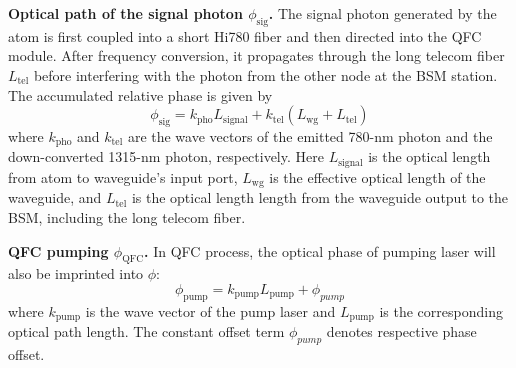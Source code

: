 \documentclass[aps,reprint,showpacs,superscriptaddress]{revtex4-2}
\begin{document}
\textbf{Optical path of the signal photon $\phi_{\text{sig}}$.}
The signal photon generated by the atom is first coupled into a short Hi780 fiber and then directed into the QFC module. After frequency conversion, it propagates through the long telecom fiber $L_{\text{tel}}$ before interfering with the photon from the other node at the BSM station. The accumulated relative phase is given by
\begin{equation}
	\phi_{\text{sig}} = k_{\text{pho}} L_{\text{signal}} + k_{\text{tel}}(L_{\text{wg}} + L_{\text{tel}})
\end{equation}
where $k_{\text{pho}}$ and $k_{\text{tel}}$ are the wave vectors of the emitted 780-nm photon and the down-converted 1315-nm photon, respectively. Here $L_{\text{signal}}$ is the optical length from atom to  waveguide's input port, $L_{\text{wg}}$ is the effective optical length of the waveguide, and $L_{\text{tel}}$ is the optical length length from the waveguide output to the BSM, including the long telecom fiber.

\textbf{QFC pumping $\phi_{\text{QFC}}$.} In QFC process, the optical phase of pumping laser will also be imprinted into $\phi$:
\begin{equation}
	\phi_{\text{pump}} = k_{\text{pump}}L_{\text{pump}} + \phi_{pump}
\end{equation}
where $k_{\text{pump}}$ is the wave vector of the pump laser and $L_{\text{pump}}$ is the corresponding optical path length. The constant offset term $\phi_{pump}$ denotes respective phase offset.
\end{document}
